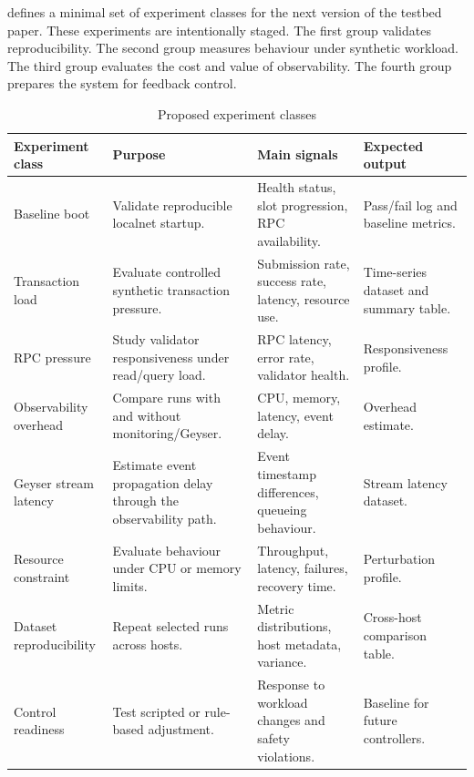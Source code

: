\documentclass[11pt,a4paper]{article}
\begin{document}
 defines a minimal set of experiment classes for the next version of the testbed paper. These experiments are intentionally staged. The first group validates reproducibility. The second group measures behaviour under synthetic workload. The third group evaluates the cost and value of observability. The fourth group prepares the system for feedback control.

\begin{table}[H]
\centering
\caption{Proposed experiment classes}
\label{tab:experiment-classes}
\begin{tabularx}{\textwidth}{L{3.0cm}Y Y Y}
\toprule
\textbf{Experiment class} & \textbf{Purpose} & \textbf{Main signals} & \textbf{Expected output} \\
\midrule
Baseline boot & Validate reproducible localnet startup. & Health status, slot progression, RPC availability. & Pass/fail log and baseline metrics. \\
Transaction load & Evaluate controlled synthetic transaction pressure. & Submission rate, success rate, latency, resource use. & Time-series dataset and summary table. \\
RPC pressure & Study validator responsiveness under read/query load. & RPC latency, error rate, validator health. & Responsiveness profile. \\
Observability overhead & Compare runs with and without monitoring/Geyser. & CPU, memory, latency, event delay. & Overhead estimate. \\
Geyser stream latency & Estimate event propagation delay through the observability path. & Event timestamp differences, queueing behaviour. & Stream latency dataset. \\
Resource constraint & Evaluate behaviour under CPU or memory limits. & Throughput, latency, failures, recovery time. & Perturbation profile. \\
Dataset reproducibility & Repeat selected runs across hosts. & Metric distributions, host metadata, variance. & Cross-host comparison table. \\
Control readiness & Test scripted or rule-based adjustment. & Response to workload changes and safety violations. & Baseline for future controllers. \\
\bottomrule
\end{tabularx}
\end{table}
\end{document}
